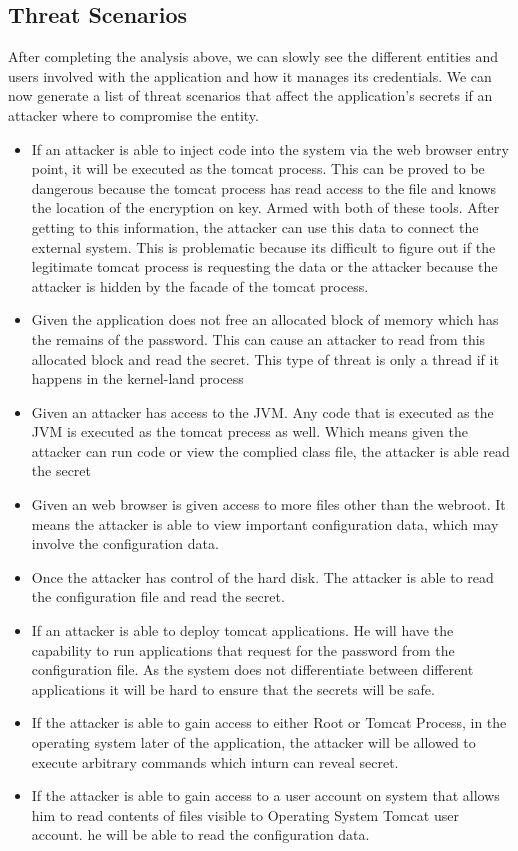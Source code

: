 \documentclass[11pt, a4paper, notitlepage]{article}
\begin{document}
\subsection*{Threat Scenarios}
After completing the analysis above, we can slowly see the different entities and users involved with the application and how it manages its credentials. We can now generate a list of threat scenarios that affect the application's secrets if an attacker where to compromise the entity. \\

\begin{itemize}
\item If an attacker is able to inject code into the system via the web browser entry point, it will be executed as the tomcat process. This can be proved to be dangerous because the tomcat process has read access to the file and knows the location of the encryption on key. Armed with both of these tools. After getting to this information, the attacker can use this data to connect the external system. This is problematic because its difficult to figure out if the legitimate tomcat process is requesting the data or the attacker because the attacker is hidden by the facade of the tomcat process.
\item Given the application does not free an allocated block of memory which has the remains of the password. This can cause an attacker to read from this allocated block and read the secret. This type of threat is only a thread if it happens in the kernel-land process
\item Given an attacker has access to the JVM. Any code that is executed as the JVM is executed as the tomcat precess as well. Which means given the attacker can run code or view the complied class file, the attacker is able read the secret
\item Given an web browser is given access to more files other than the webroot. It means the attacker is able to view important configuration data, which may involve the configuration data. 
\item Once the attacker has control of the hard disk. The attacker is able to read the configuration file and read the secret.
\item If an attacker is able to deploy tomcat applications. He will have the capability to run applications that request for the password from the configuration file. As the system does not differentiate between different applications it will be hard to ensure that the secrets will be safe.
\item If the attacker is able to gain access to either Root or Tomcat Process, in the operating system later of the application, the attacker will be allowed to execute arbitrary  commands which inturn can reveal secret.
\item If the attacker is able to gain access to a user account on system that allows him to read contents of files visible to Operating System Tomcat user account. he will be able to read the configuration data.
\end{itemize} 
\end{document}
